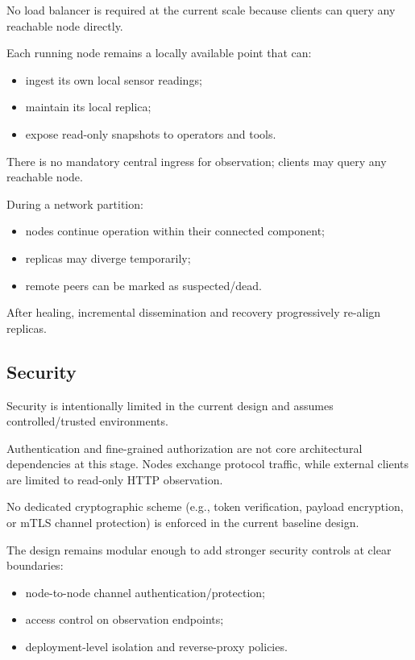 No load balancer is required at the current scale because clients can query any reachable node directly.

Each running node remains a locally available point that can:
\begin{itemize}
  \item ingest its own local sensor readings;
  \item maintain its local replica;
  \item expose read-only snapshots to operators and tools.
\end{itemize}

There is no mandatory central ingress for observation; clients may query any reachable node.

During a network partition:
\begin{itemize}
  \item nodes continue operation within their connected component;
  \item replicas may diverge temporarily;
  \item remote peers can be marked as suspected/dead.
\end{itemize}

After healing, incremental dissemination and recovery progressively re-align replicas.

\subsection{Security}\label{security}

Security is intentionally limited in the current design and assumes controlled/trusted environments.

Authentication and fine-grained authorization are not core architectural dependencies at this stage. Nodes exchange protocol traffic, while external clients are limited to read-only HTTP observation.

No dedicated cryptographic scheme (e.g., token verification, payload encryption, or mTLS channel protection) is enforced in the current baseline design.

The design remains modular enough to add stronger security controls at clear boundaries:
\begin{itemize}
  \item node-to-node channel authentication/protection;
  \item access control on observation endpoints;
  \item deployment-level isolation and reverse-proxy policies.
\end{itemize}

\clearpage

